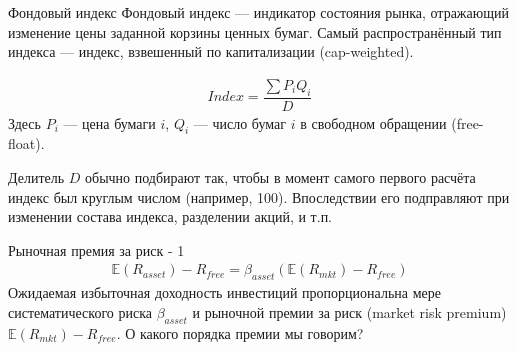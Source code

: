 \documentclass{beamer}
\begin{document}
\begin{frame}{Фондовый индекс}
\justify
Фондовый индекс --- индикатор состояния рынка, отражающий изменение цены заданной корзины ценных бумаг. Самый распространённый тип индекса --- индекс, взвешенный по капитализации (cap-weighted).

\begin{align*}
Index = \dfrac{\sum P_iQ_i}{D}
\end{align*}
Здесь $P_i$ --- цена бумаги $i$, $Q_i$ --- число бумаг $i$ в свободном обращении (free-float).

\vspace{\baselineskip}
Делитель $D$ обычно подбирают так, чтобы в момент самого первого расчёта индекс был круглым числом (например, 100). Впоследствии его подправляют при изменении состава индекса, разделении акций, и т.п.
\end{frame}



\begin{frame}{Рыночная премия за риск - 1}
\begin{align*}
\mathbb{E}(R_{asset}) - R_{free} = \beta_{asset}(\mathbb{E}(R_{mkt}) - R_{free})
\end{align*}
\justify
Ожидаемая избыточная доходность инвестиций пропорциональна мере систематического риска $\beta_{asset}$ и рыночной премии за риск (market risk premium) $\mathbb{E}(R_{mkt}) - R_{free}$. О какого порядка премии мы говорим?
\end{frame}



    \newcommand{\addGrowthPlot}[4]{
        \addplot[
            color = #2,
            line width = 1pt, 
            mark = #3,
            mark repeat = 120,
            mark phase = 396,
            mark options = {scale=2},
            style = #4
        ]
        table[
            x = date,
            y = #1,
            col sep = comma
        ]
        {data/fama_french_cumulative_growth_data.csv};
    }
    
    \newcommand{\addFlatLine}[5] {
        \draw[
            red,
            thick
        ]
        (axis cs: #1, #3) -- (axis cs: #2, #3)
        node[
            pos=#5,
            anchor=south
        ]
        {\scriptsize #4};
    }
    
    \newcommand{\addLossLine}[5] {
        \draw[
            red,
            thick
        ]
        (axis cs: #1, #3) -- (axis cs: #2, #4)
        node[
            anchor=west
        ]
        {\scriptsize #5\%};
    }
\end{document}
